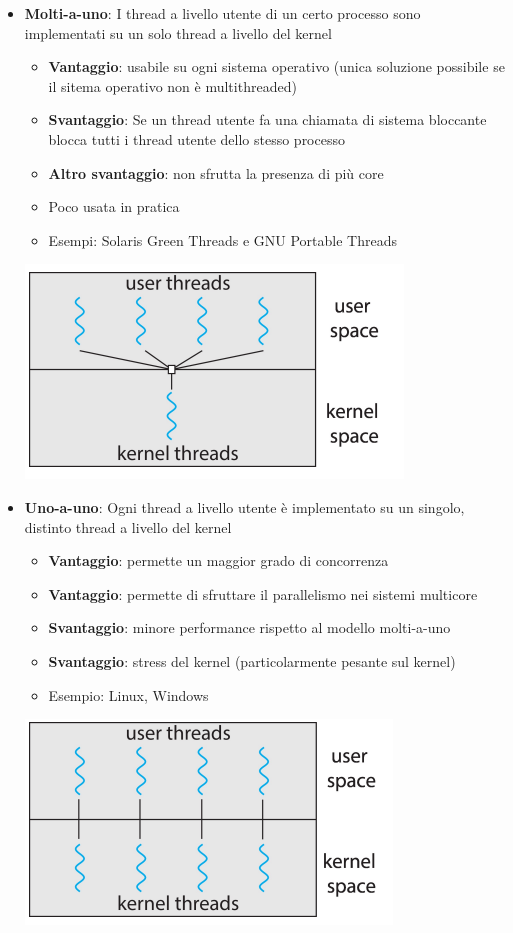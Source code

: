\documentclass[12pt]{article}
\begin{document}
\begin{itemize}
    \item \textbf{Molti-a-uno}: I thread a livello utente di un certo processo sono implementati su un solo thread a livello del kernel
    \begin{itemize}
        \item \textbf{Vantaggio}: usabile su ogni sistema operativo (unica soluzione possibile se il sitema operativo non è multithreaded)
        \item \textbf{Svantaggio}: Se un thread utente fa una chiamata di sistema bloccante blocca tutti i thread utente dello stesso processo
        \item \textbf{Altro svantaggio}: non sfrutta la presenza di più core
        \item Poco usata in pratica
        \item Esempi: Solaris Green Threads e GNU Portable Threads
    \end{itemize}
    \begin{center}
        \includegraphics[width = 0.40\linewidth]{Images/42.png}
    \end{center}
    \item \textbf{Uno-a-uno}: Ogni thread a livello utente è implementato su un singolo, distinto thread a livello del kernel
    \begin{itemize}
        \item \textbf{Vantaggio}: permette un maggior grado di concorrenza
        \item \textbf{Vantaggio}: permette di sfruttare il parallelismo nei sistemi multicore
        \item \textbf{Svantaggio}: minore performance rispetto al modello molti-a-uno
        \item \textbf{Svantaggio}: stress del kernel (particolarmente pesante sul kernel)
        \item Esempio: Linux, Windows
    \end{itemize}
    \begin{center}
        \includegraphics[width = 0.40\linewidth]{Images/43.png}

\end{center}
\end{itemize}
\end{document}
